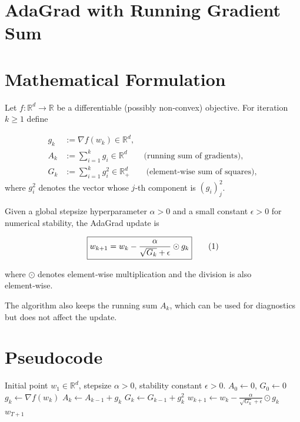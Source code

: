 \documentclass{article}
\begin{document}
\section*{AdaGrad with Running Gradient Sum}

\section*{Mathematical Formulation}
Let $f:\mathbb{R}^{d}\rightarrow\mathbb{R}$ be a differentiable (possibly non‑convex) objective.  
For iteration $k\ge 1$ define  

\[
\begin{aligned}
g_{k} &:= \nabla f(w_{k})\in\mathbb{R}^{d},\\[2mm]
A_{k} &:= \sum_{i=1}^{k} g_{i}\in\mathbb{R}^{d}\qquad\text{(running sum of gradients)},\\[2mm]
G_{k} &:= \sum_{i=1}^{k} g_{i}^{2}\in\mathbb{R}^{d}_{+}\qquad\text{(element‑wise sum of squares)},
\end{aligned}
\]
where $g_{i}^{2}$ denotes the vector whose $j$‑th component is $(g_{i})_{j}^{2}$.

Given a global stepsize hyperparameter $\alpha>0$ and a small constant $\epsilon>0$ for numerical stability, the AdaGrad update is  

\[
\boxed{%
w_{k+1}=w_{k}-\frac{\alpha}{\sqrt{G_{k}}+\epsilon}\odot g_{k}}
\tag{1}
\]

where $\odot$ denotes element‑wise multiplication and the division is also element‑wise.

The algorithm also keeps the running sum $A_{k}$, which can be used for diagnostics but does not affect the update.

\section*{Pseudocode}
\begin{algorithm}[H]
\caption{AdaGrad with Running Gradient Sum}
\begin{algorithmic}[1]
\Require Initial point $w_{1}\in\mathbb{R}^{d}$, stepsize $\alpha>0$, stability constant $\epsilon>0$.
\State $A_{0}\gets 0$, $G_{0}\gets 0$ 
    \State $g_{k}\gets \nabla f(w_{k})$
    \State $A_{k}\gets A_{k-1}+g_{k}$
    \State $G_{k}\gets G_{k-1}+g_{k}^{2}$ 
    \State $w_{k+1}\gets w_{k}-\displaystyle\frac{\alpha}{\sqrt{G_{k}}+\epsilon}\odot g_{k}$
\EndFor
\State \Return $w_{T+1}$
\end{algorithmic}
\end{algorithm}
\end{document}

